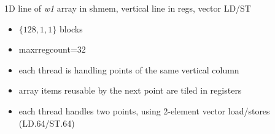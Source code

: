 \documentclass[aspectratio=169]{beamer}
\begin{document}
\begin{frame}[fragile,t]{1D line of \emph{w1} array in shmem, vertical line in regs, vector LD/ST}

\begin{minipage}[t][2.5cm]{\textwidth}
\begin{itemize}
\item $\{128, 1, 1\}$ blocks
\item maxrregcount=32
\item each thread is handling points of the same vertical column
\item array items reusable by the next point are tiled in registers
\item each thread handles two points, using 2-element vector load/stores (LD.64/ST.64)
\end{itemize}
\end{minipage}

%
\end{frame}
\end{document}
